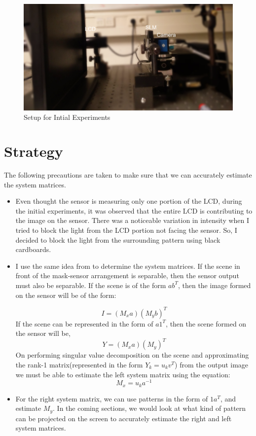 \begin{figure}[h]
\centering
\includegraphics[width = 0.75\linewidth]{pics/experiment_lcd}
\caption{Setup for Intial Experiments}
\label{fig:experiment_lcd}
\end{figure}

\section{Strategy}
The following precautions are taken to make sure that we can accurately estimate the system matrices.
\begin{itemize}
\item Even thought the sensor is measuring only one portion of the LCD, during the initial experiments, it was observed that the entire LCD is contributing to the image on the sensor. There was a noticeable variation in intensity when I tried to block the light from the LCD portion not facing the sensor. So, I decided to block the light from the surrounding pattern using black cardboards.
\item I use the same idea from \cite{Flatcam} to determine the system matrices. If the scene in front of the mask-sensor arrangement is separable, then the sensor output must also be separable. If the scene is of the form $ab^T$, then the image formed on the sensor will be of the form:

\begin{equation}
I = (M_xa)(M_yb)^T
\end{equation}
If the scene can be represented in the form of $a1^T$, then the scene formed on the sensor will be,
\begin{equation}
Y = (M_xa)(M_y)^T
\label{eq:separ_eq}
\end{equation}
On performing singular value decomposition on the scene and approximating the rank-1 matrix(represented in the form $Y_k = u_k v^T$) from the output image we must be able to estimate the left system matrix using the equation:
\begin{equation}
M_x = u_ka^{-1}
\end{equation}
\item For the right system matrix, we can use patterns in the form of $1a^T$, and estimate $M_y$. In the coming sections, we would look at what kind of pattern can be projected on the screen to accurately estimate the right and left system matrices. 
\end{itemize}
